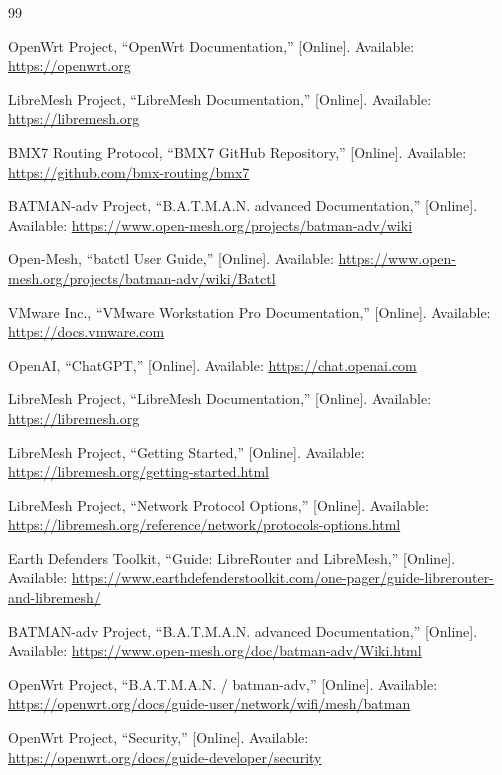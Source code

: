 \documentclass[conference]{IEEEtran}
\begin{document}
\begin{thebibliography}{99}

OpenWrt Project, ``OpenWrt Documentation,'' [Online]. Available: \url{https://openwrt.org}

LibreMesh Project, ``LibreMesh Documentation,'' [Online]. Available: \url{https://libremesh.org}

BMX7 Routing Protocol, ``BMX7 GitHub Repository,'' [Online]. Available: \url{https://github.com/bmx-routing/bmx7}

BATMAN-adv Project, ``B.A.T.M.A.N. advanced Documentation,'' [Online]. Available: \url{https://www.open-mesh.org/projects/batman-adv/wiki}

Open-Mesh, ``batctl User Guide,'' [Online]. Available: \url{https://www.open-mesh.org/projects/batman-adv/wiki/Batctl}

VMware Inc., ``VMware Workstation Pro Documentation,'' [Online]. Available: \url{https://docs.vmware.com}

OpenAI, ``ChatGPT,'' [Online]. Available: \url{https://chat.openai.com}

LibreMesh Project, ``LibreMesh Documentation,'' [Online]. Available: \url{https://libremesh.org}

LibreMesh Project, ``Getting Started,'' [Online]. Available: \url{https://libremesh.org/getting-started.html}

LibreMesh Project, ``Network Protocol Options,'' [Online]. Available: \url{https://libremesh.org/reference/network/protocols-options.html}

Earth Defenders Toolkit, ``Guide: LibreRouter and LibreMesh,'' [Online]. Available: \url{https://www.earthdefenderstoolkit.com/one-pager/guide-librerouter-and-libremesh/}

BATMAN-adv Project, ``B.A.T.M.A.N. advanced Documentation,'' [Online]. Available: \url{https://www.open-mesh.org/doc/batman-adv/Wiki.html}

OpenWrt Project, ``B.A.T.M.A.N. / batman-adv,'' [Online]. Available: \url{https://openwrt.org/docs/guide-user/network/wifi/mesh/batman}

OpenWrt Project, ``Security,'' [Online]. Available: \url{https://openwrt.org/docs/guide-developer/security}


\end{thebibliography}
\end{document}

